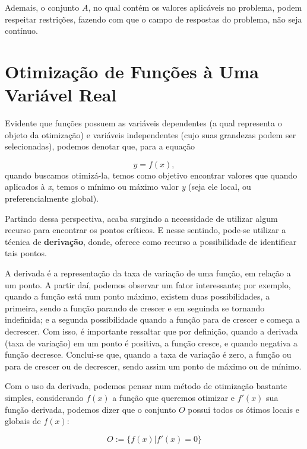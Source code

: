 Ademais, o conjunto $A$, no qual contém os valores aplicáveis no problema, podem
respeitar restrições, fazendo com que o campo de respostas do problema, não seja
contínuo.

\section{{Otimização de Funções à Uma Variável Real}}

\hspace{0.8cm}

Evidente que funções possuem as variáveis dependentes (a qual representa o
objeto da otimização) e variáveis independentes (cujo suas grandezas podem ser
selecionadas), podemos denotar que, para a equação

\begin{equation}
	y = f(x),
\end{equation}
quando buscamos otimizá-la, temos como objetivo encontrar valores que quando
aplicados à \textit{x}, temos o mínimo ou máximo valor \textit{y} (seja ele
local, ou preferencialmente global).

Partindo dessa perspectiva, acaba surgindo a necessidade de utilizar algum
recurso para encontrar os pontos críticos. E nesse sentindo, pode-se utilizar
a técnica de \textbf{derivação}, donde, oferece como recurso a possibilidade de
identificar tais pontos.

A derivada é a representação da taxa de variação de uma função, em relação a
um ponto. A partir daí, podemos observar um fator interessante; por exemplo,
quando a função está num ponto máximo, existem duas possibilidades, a primeira,
sendo a função parando de crescer e em seguinda se tornando indefinida; e a
segunda possibilidade quando a função para de crescer e começa a decrescer.
Com isso, é importante ressaltar que por definição, quando a derivada (taxa de
variação) em um ponto é positiva, a função cresce, e quando negativa a função
decresce. Conclui-se que, quando a taxa de variação é zero, a função ou para de
crescer ou de decrescer, sendo assim um ponto de máximo ou de mínimo.

Com o uso da derivada, podemos pensar num método de otimização bastante simples,
considerando \(f(x)\) a função que queremos otimizar e \(f'(x)\) sua função
derivada, podemos dizer que o conjunto $O$ possui todos os ótimos locais e
globais de \(f(x)\):

\begin{equation}
    O := \{f(x) | f'(x) = 0\}
\end{equation}


